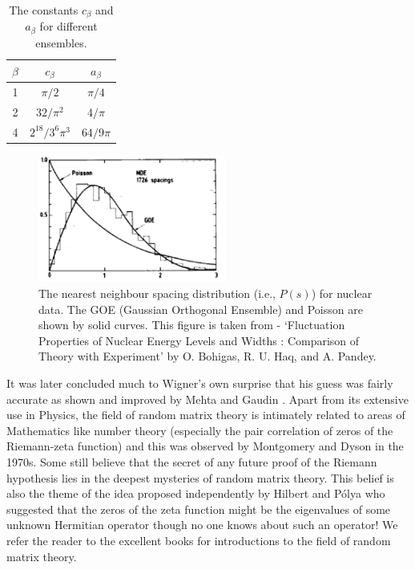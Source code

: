 \documentclass[letter,11pt]{article}
\begin{document}
\begin{table}[h!]
	\centering
	\begin{tabular}{||c c c||} 
		\hline
		$\beta$ & $c_{\beta}$ & $a_{\beta}$ \\ [0.5ex] 
		\hline\hline
		1 & $\pi/2$ & $\pi/4$  \\ 
		2 & $32/\pi^2$ & $4/\pi$  \\
		4 & $2^{18}/3^6 \pi^3$ & $64/9\pi$
		 \\ [1ex] 
		\hline 
	\end{tabular}
\caption{The constants $c_{\beta}$ and $a_{\beta}$ for different ensembles.}
\label{table:c_and_a}
\end{table}

\begin{figure}[htbp] 
	\centering 
	\includegraphics[width=0.55\textwidth]{figs/data_exp.png}
	\caption{\label{fig:data_exp1}The nearest neighbour spacing distribution (i.e., $P(s)$) 
	for nuclear data. The GOE (Gaussian Orthogonal Ensemble) and Poisson are shown 
	by solid curves. This figure is taken from - `Fluctuation Properties of Nuclear Energy 
	Levels and Widths : Comparison of Theory with Experiment' by O. Bohigas, R. U. 
	Haq, and A. Pandey.}
\end{figure}

It was later concluded much to Wigner's own surprise that
his guess was fairly accurate as shown and improved by Mehta \cite{MEHTA1960395} and 
Gaudin \cite{GAUDIN1961447}. Apart from its extensive use in Physics, the field of random matrix theory 
is intimately related to areas of Mathematics like number theory 
(especially the pair correlation of zeros of the Riemann-zeta function) and this was 
observed by Montgomery and Dyson in the 1970s. Some still believe that the secret of any future proof of the
Riemann hypothesis lies in the
deepest mysteries of random matrix theory. This belief is also the theme of the idea proposed 
independently by  Hilbert and P\'{o}lya who suggested that the zeros of the zeta function 
might be the eigenvalues of some unknown Hermitian operator though 
no one knows about such an operator! We refer the reader to the excellent books \cite{Meh2004, Akemann:2011csh} 
for introductions to the field of random matrix theory. 
\end{document}

